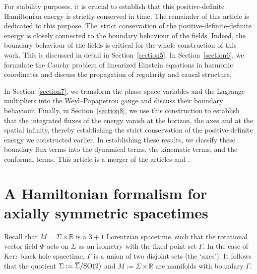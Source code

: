 \documentclass[pdftex]{sigma}
\def\olin#1{\overline{#1}{}}%
\numberwithin{equation}{section}
\begin{document}
For stability purposes, it is crucial to establish that this positive-definite Hamiltonian energy is strictly conserved in time. The remainder of this article is dedicated to this purpose. The~strict conservation of the positive-definite-definite energy is closely connected to the boundary behaviour of the fields. Indeed, the boundary behaviour of the fields is critical for the whole construction of this work. This is discussed in detail in Section~\ref{section5}. In Section~\ref{section6}, we formulate the Cauchy problem of linearized Einstein equations in harmonic coordinates and discuss the propagation of regularity and causal structure.

In Section~\ref{section7}, we transform the phase-space variables and the Lagrange multipliers into the Weyl--Papapetrou gauge and discuss their boundary behaviour. Finally, in Section~\ref{section8}, we use this construction to establish that the integrated fluxes of the energy vanish at the horizon, the axes and at the spatial infinity, thereby establishing the strict conservation of the positive-definite energy we constructed earlier. In establishing these results, we classify these boundary flux terms into the dynamical terms, the kinematic terms, and the conformal terms.
This article is a merger of the articles \cite{NG_19_2} and \cite{NG_21_1}.

\section{A Hamiltonian formalism for axially symmetric spacetimes}\label{section2}
Recall that $\bar{M} = \olin{\Sigma} \times \mathbb{R} $ is a $3+1$ Lorentzian spacetime, such that the rotational vector field $\Phi$ acts on $\olin{\Sigma}$ as an isometry with the fixed point set $\Gamma$. In the case of Kerr black hole spacetime, $\Gamma$ is a union of two disjoint sets (the `axes'). It follows that the quotient $\Sigma := \olin{\Sigma}/{\rm SO}(2)$ and $M := \Sigma \times \mathbb{R}$ are manifolds with boundary $\Gamma$.
\end{document}
